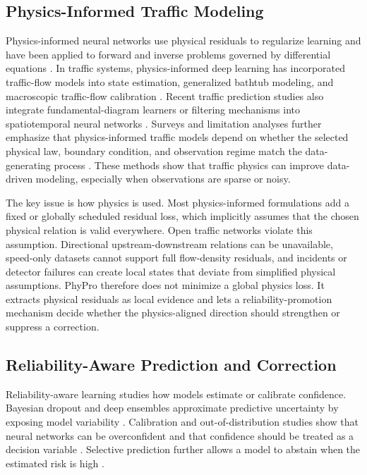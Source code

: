 \documentclass[preprint,12pt]{elsarticle}
\begin{document}
\subsection{Physics-Informed Traffic Modeling}
Physics-informed neural networks use physical residuals to regularize learning and have been applied to forward and inverse problems governed by differential equations \citep{raissi2019pinn}. In traffic systems, physics-informed deep learning has incorporated traffic-flow models into state estimation, generalized bathtub modeling, and macroscopic traffic-flow calibration \citep{shi2021pidl,yuan2024bathtub,tang2024pimlcalibration}. Recent traffic prediction studies also integrate fundamental-diagram learners or filtering mechanisms into spatiotemporal neural networks \citep{wang2024pistgnet,deshpande2025pigrnn}. Surveys and limitation analyses further emphasize that physics-informed traffic models depend on whether the selected physical law, boundary condition, and observation regime match the data-generating process \citep{di2023pidlsurvey,huang2023pidllimit}. These methods show that traffic physics can improve data-driven modeling, especially when observations are sparse or noisy.

The key issue is how physics is used. Most physics-informed formulations add a fixed or globally scheduled residual loss, which implicitly assumes that the chosen physical relation is valid everywhere. Open traffic networks violate this assumption. Directional upstream-downstream relations can be unavailable, speed-only datasets cannot support full flow-density residuals, and incidents or detector failures can create local states that deviate from simplified physical assumptions. PhyPro therefore does not minimize a global physics loss. It extracts physical residuals as local evidence and lets a reliability-promotion mechanism decide whether the physics-aligned direction should strengthen or suppress a correction.

\subsection{Reliability-Aware Prediction and Correction}
Reliability-aware learning studies how models estimate or calibrate confidence. Bayesian dropout and deep ensembles approximate predictive uncertainty by exposing model variability \citep{gal2016dropout,lakshminarayanan2017deepensembles}. Calibration and out-of-distribution studies show that neural networks can be overconfident and that confidence should be treated as a decision variable \citep{hendrycks2017baseline,guo2017calibration}. Selective prediction further allows a model to abstain when the estimated risk is high \citep{geifman2019selectivenet}.
\end{document}
